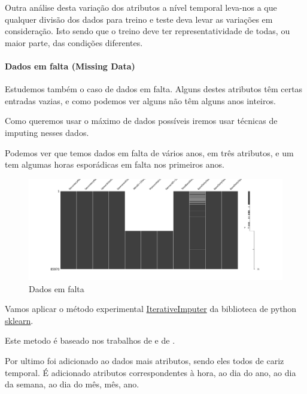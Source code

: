 Outra análise desta variação dos atributos a nível temporal leva-nos a que qualquer divisão dos dados para treino e teste deva levar as variações em consideração. Isto sendo que o treino deve ter representatividade de todas, ou maior parte, das condições diferentes.\par


\paragraph{Dados em falta (Missing Data)}
\text{ }  \par

Estudemos também o caso de dados em falta. Alguns destes atributos têm certas entradas vazias, e como podemos ver alguns não têm alguns anos inteiros.\par
Como queremos usar o máximo de dados possíveis iremos usar técnicas de imputing nesses dados.\par
Podemos ver que temos dados em falta de vários anos, em três atributos, e um tem algumas horas esporádicas em falta nos primeiros anos.\par

\begin{figure}[H]
  \centering
  \includegraphics[width=\textwidth]{plots/missing_data.png}
  \caption{Dados em falta}
\end{figure}

Vamos aplicar o método experimental \href{https://scikit-learn.org/stable/modules/generated/sklearn.impute.IterativeImputer.html}{IterativeImputer} da biblioteca de python \href{https://scikit-learn.org/stable/index.html}{sklearn}.\par
Este metodo é baseado nos trabalhos de \cite{vanBuuren2011} e de \cite{Buck1960}.\par
Por ultimo foi adicionado ao dados mais atributos, sendo eles todos de cariz temporal. É adicionado atributos correspondentes à hora, ao dia do ano, ao dia da semana, ao dia do mês, mês, ano.\par

